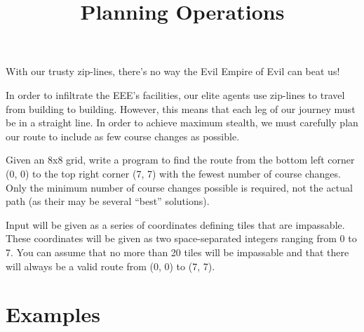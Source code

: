 \documentclass{../codeproblem}
\begin{document}
\title{Planning Operations}
\begin{flavor}
  With our trusty zip-lines, there's no way the Evil Empire of Evil can beat us!
\end{flavor}

In order to infiltrate the EEE's facilities, our elite agents use zip-lines to travel from building to building. However, this means that each leg of our journey must be in a straight line. In order to achieve maximum stealth, we must carefully plan our route to include as few course changes as possible.

Given an 8x8 grid, write a program to find the route from the bottom left corner (0, 0) to the top right corner (7, 7) with the fewest number of course changes. Only the minimum number of course changes possible is required, not the actual path (as their may be several ``best'' solutions).

Input will be given as a series of coordinates defining tiles that are impassable. These coordinates will be given as two space-separated integers ranging from 0 to 7. You can assume that no more than 20 tiles will be impassable and that there will always be a valid route from (0, 0) to (7, 7).

\section*{Examples}
\end{document}
